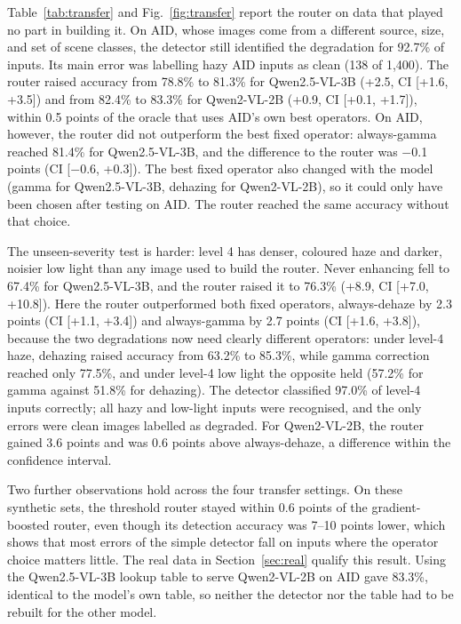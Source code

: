 \documentclass[lettersize,journal]{IEEEtran}
\begin{document}
Table~\ref{tab:transfer} and Fig.~\ref{fig:transfer} report the router on data that played no part in building it. On AID, whose images come from a different source, size, and set of scene classes, the detector still identified the degradation for 92.7\% of inputs. Its main error was labelling hazy AID inputs as clean (138 of 1,400). The router raised accuracy from 78.8\% to 81.3\% for Qwen2.5-VL-3B (+2.5, CI [+1.6, +3.5]) and from 82.4\% to 83.3\% for Qwen2-VL-2B (+0.9, CI [+0.1, +1.7]), within 0.5 points of the oracle that uses AID's own best operators. On AID, however, the router did not outperform the best fixed operator: always-gamma reached 81.4\% for Qwen2.5-VL-3B, and the difference to the router was $-$0.1 points (CI [$-$0.6, +0.3]). The best fixed operator also changed with the model (gamma for Qwen2.5-VL-3B, dehazing for Qwen2-VL-2B), so it could only have been chosen after testing on AID. The router reached the same accuracy without that choice.

The unseen-severity test is harder: level 4 has denser, coloured haze and darker, noisier low light than any image used to build the router. Never enhancing fell to 67.4\% for Qwen2.5-VL-3B, and the router raised it to 76.3\% (+8.9, CI [+7.0, +10.8]). Here the router outperformed both fixed operators, always-dehaze by 2.3 points (CI [+1.1, +3.4]) and always-gamma by 2.7 points (CI [+1.6, +3.8]), because the two degradations now need clearly different operators: under level-4 haze, dehazing raised accuracy from 63.2\% to 85.3\%, while gamma correction reached only 77.5\%, and under level-4 low light the opposite held (57.2\% for gamma against 51.8\% for dehazing). The detector classified 97.0\% of level-4 inputs correctly; all hazy and low-light inputs were recognised, and the only errors were clean images labelled as degraded. For Qwen2-VL-2B, the router gained 3.6 points and was 0.6 points above always-dehaze, a difference within the confidence interval.

Two further observations hold across the four transfer settings. On these synthetic sets, the threshold router stayed within 0.6 points of the gradient-boosted router, even though its detection accuracy was 7--10 points lower, which shows that most errors of the simple detector fall on inputs where the operator choice matters little. The real data in Section~\ref{sec:real} qualify this result. Using the Qwen2.5-VL-3B lookup table to serve Qwen2-VL-2B on AID gave 83.3\%, identical to the model's own table, so neither the detector nor the table had to be rebuilt for the other model.
\end{document}
